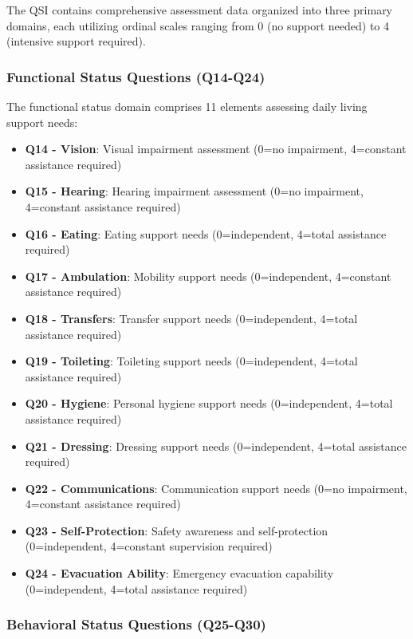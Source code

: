 \documentclass[12pt]{article}
\begin{document}
The QSI contains comprehensive assessment data organized into three primary domains, each utilizing ordinal scales ranging from 0 (no support needed) to 4 (intensive support required).

\subsubsection{Functional Status Questions (Q14-Q24)}

The functional status domain comprises 11 elements assessing daily living support needs:

\begin{itemize}
    \item \textbf{Q14 - Vision}: Visual impairment assessment (0=no impairment, 4=constant assistance required)
    \item \textbf{Q15 - Hearing}: Hearing impairment assessment (0=no impairment, 4=constant assistance required)
    \item \textbf{Q16 - Eating}: Eating support needs (0=independent, 4=total assistance required)
    \item \textbf{Q17 - Ambulation}: Mobility support needs (0=independent, 4=constant assistance required)
    \item \textbf{Q18 - Transfers}: Transfer support needs (0=independent, 4=total assistance required)
    \item \textbf{Q19 - Toileting}: Toileting support needs (0=independent, 4=total assistance required)
    \item \textbf{Q20 - Hygiene}: Personal hygiene support needs (0=independent, 4=total assistance required)
    \item \textbf{Q21 - Dressing}: Dressing support needs (0=independent, 4=total assistance required)
    \item \textbf{Q22 - Communications}: Communication support needs (0=no impairment, 4=constant assistance required)
    \item \textbf{Q23 - Self-Protection}: Safety awareness and self-protection (0=independent, 4=constant supervision required)
    \item \textbf{Q24 - Evacuation Ability}: Emergency evacuation capability (0=independent, 4=total assistance required)
\end{itemize}

\subsubsection{Behavioral Status Questions (Q25-Q30)}
\end{document}
